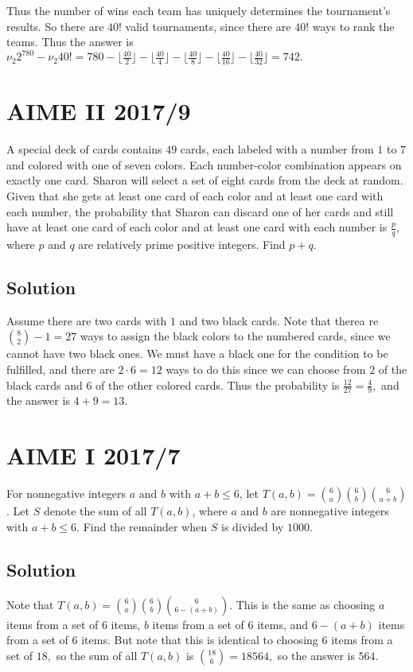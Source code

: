 \documentclass[mast]{lucky}
\begin{document}
Thus the number of wins each team has uniquely determines the tournament's results. So there are $40!$ valid tournaments, since there are $40!$ ways to rank the teams. Thus the answer is $\nu_2{2^780}-\nu_2{40!}=780-\lfloor\frac{40}{2}\rfloor-\lfloor\frac{40}{4}\rfloor-\lfloor\frac{40}{8}\rfloor-\lfloor\frac{40}{16}\rfloor-\lfloor\frac{40}{32}\rfloor=742.$

\pagebreak\section{AIME II 2017/9}{A special deck of cards contains $49$ cards, each labeled with a number from $1$ to $7$ and colored with one of seven colors. Each number-color combination appears on exactly one card. Sharon will select a set of eight cards from the deck at random. Given that she gets at least one card of each color and at least one card with each number, the probability that Sharon can discard one of her cards and still have at least one card of each color and at least one card with each number is $\frac{p}{q}$, where $p$ and $q$ are relatively prime positive integers. Find $p+q$.}
\subsection{Solution}
Assume there are two cards with $1$ and two black cards. Note that therea re $\binom{8}{2}-1=27$ ways to assign the black colors to the numbered cards, since we cannot have two black ones. We must have a black one for the condition to be fulfilled, and there are $2\cdot 6=12$ ways to do this since we can choose from $2$ of the black cards and $6$ of the other colored cards. Thus the probability is $\frac{12}{27}=\frac{4}{9},$ and the answer is $4+9=13.$





\pagebreak\section{AIME I 2017/7}{For nonnegative integers $a$ and $b$ with $a + b \leq 6$, let $T(a, b) = \binom{6}{a} \binom{6}{b} \binom{6}{a + b}$. Let $S$ denote the sum of all $T(a, b)$, where $a$ and $b$ are nonnegative integers with $a + b \leq 6$. Find the remainder when $S$ is divided by $1000$.}
\subsection{Solution}
Note that $T(a,b)=\binom{6}{a}\binom{6}{b}\binom{6}{6-(a+b)}.$ This is the same as choosing $a$ items from a set of $6$ items, $b$ items from a set of $6$ items, and $6-(a+b)$ items from a set of $6$ items. But note that this is identical to choosing $6$ items from a set of $18,$ so the sum of all $T(a,b)$ is $\binom{18}{6}=18564,$ so the answer is $564.$
\end{document}
